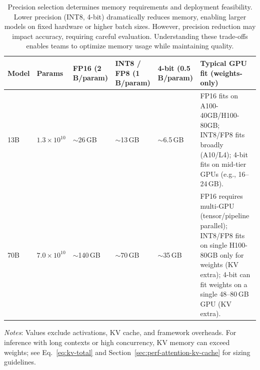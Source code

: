\begin{table}[tb]
\centering
\small
\caption{Precision selection determines memory requirements and deployment feasibility. Lower precision (INT8, 4-bit) dramatically reduces memory, enabling larger models on fixed hardware or higher batch sizes. However, precision reduction may impact accuracy, requiring careful evaluation. Understanding these trade-offs enables teams to optimize memory usage while maintaining quality.}
\label{tab:ch07_mem_vs_precision}
\setlength{\tabcolsep}{6pt}
\renewcommand{\arraystretch}{1.3}
\begin{tabularx}{0.95\linewidth}{@{}>{\raggedright\arraybackslash}p{1.2cm}
                  >{\raggedleft\arraybackslash}p{1.6cm}
                  >{\raggedleft\arraybackslash}p{1.8cm}
                  >{\raggedleft\arraybackslash}p{1.8cm}
                  >{\raggedleft\arraybackslash}p{1.8cm}
                  >{\raggedright\arraybackslash}X@{}}
\toprule
\rowcolor{gray!15}
\textbf{Model} & \textbf{Params} & \textbf{FP16 (2\,B/param)} & \textbf{INT8 / FP8 (1\,B/param)} & \textbf{4-bit (0.5\,B/param)} & \textbf{Typical GPU fit (weights-only)} \\
\midrule
13B & $1.3\times 10^{10}$ & $\sim$26\,GB & $\sim$13\,GB & $\sim$6.5\,GB &
FP16 fits on A100-40GB/H100-80GB; INT8/FP8 fits broadly (A10/L4); 4-bit fits on mid-tier GPUs (e.g., 16--24\,GB). \\
\addlinespace[2pt]
70B & $7.0\times 10^{10}$ & $\sim$140\,GB & $\sim$70\,GB & $\sim$35\,GB &
FP16 requires multi-GPU (tensor/pipeline parallel); INT8/FP8 fits on single H100-80GB only for weights (KV extra); 4-bit can fit weights on a single 48--80\,GB GPU (KV extra). \\
\bottomrule
\end{tabularx}

\medskip
\footnotesize\emph{Notes}: Values exclude activations, KV cache, and framework overheads. For inference with long contexts or high concurrency, KV memory can exceed weights; see Eq.~\eqref{eq:kv-total} and Section~\ref{sec:perf-attention-kv-cache} for sizing guidelines.
\end{table}

